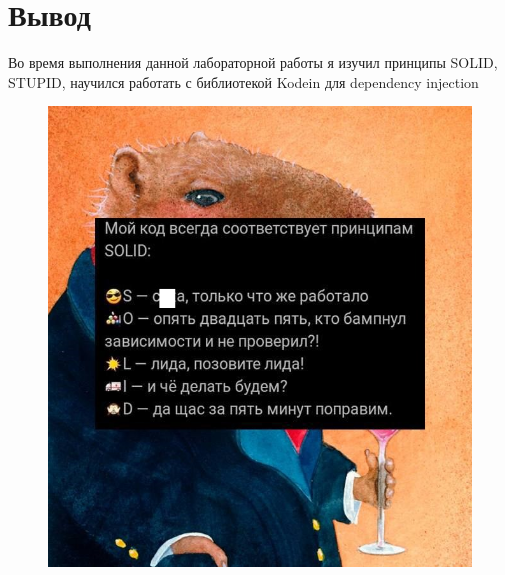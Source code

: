 \section{Вывод}
Во время выполнения данной лабораторной работы я изучил принципы SOLID, STUPID,
научился работать с библиотекой Kodein для dependency injection

\begin{figure}[ht]
    \centering
    \includegraphics[scale=1]{img/meme.jpg}
\end{figure}